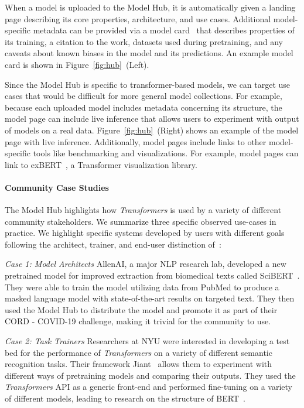 When a model is uploaded to the Model Hub, it is automatically given a landing page describing its core properties, architecture, and use cases. Additional model-specific metadata can be provided via a model card~\cite{Mitchell2018-ai} that describes properties of its training, a citation to the work, datasets used during pretraining, and any caveats about known biases in the model and its predictions. An example model card is shown in Figure~\ref{fig:hub}~(Left).

Since the Model Hub is specific to transformer-based models, we can target use cases that would be difficult for more general model collections. For example, because each uploaded model includes metadata concerning its structure, the model page can include live inference that allows users to experiment with output of models on a real data. Figure~\ref{fig:hub}~(Right) shows an example of the model page with live inference. Additionally, model pages include links to other model-specific tools like benchmarking and visualizations. For example, model pages can link to exBERT~\cite{Hoover2019-kc}, a Transformer visualization library. 

\paragraph{Community Case Studies} The Model Hub highlights how \textit{Transformers} is used by a variety of different community stakeholders. We summarize three specific observed use-cases in practice. We highlight specific systems developed by users with different goals following the  architect, trainer, and end-user distinction of~\citet{strobelt2017lstmvis}: 

 \textit{Case 1: Model Architects} AllenAI, a major NLP research lab, developed a new pretrained model for improved extraction from biomedical texts called SciBERT~\cite{Beltagy2019-op}. They were able to train the model utilizing data from PubMed to produce a masked language model with state-of-the-art results on targeted text. They then used the Model Hub to distribute the model and promote it as part of their CORD - COVID-19 challenge, making it trivial for the community to use.

 \textit{Case 2: Task Trainers} Researchers at NYU were interested in developing a test bed for the performance of \textit{Transformers} on a variety of different semantic recognition tasks. Their framework Jiant~\cite{pruksachatkun2020jiant} allows them to experiment with different ways of pretraining models and comparing their outputs. They used the \textit{Transformers} API as a generic front-end and performed fine-tuning on a variety of different models, leading to research on the structure of BERT~\cite{Tenney2019BERTRT}. 

